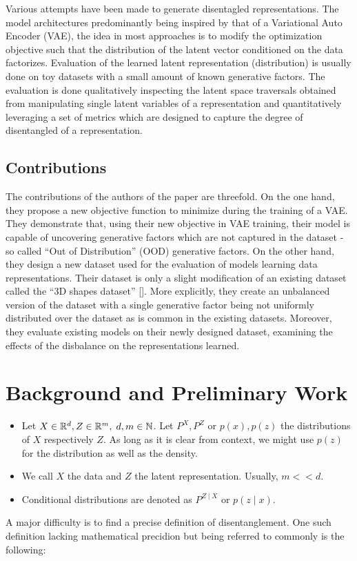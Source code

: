 \documentclass[twoside,11pt]{article}
\newcommand{\N}{\mathbb{N}}
\newcommand{\R}{\mathbb{R}}
\begin{document}
Various attempts have been made to generate disentagled representations. The model architectures predominantly being inspired by that of a Variational Auto Encoder (VAE), the idea in most approaches is to modify the optimization objective such that the distribution of the latent vector conditioned on the data factorizes.
Evaluation of the learned latent representation (distribution) is usually done on toy datasets with a small amount of known generative factors. The evaluation is done qualitatively inspecting the latent space traversals obtained from manipulating single latent variables of a representation and quantitatively leveraging a set of metrics which are designed to capture the degree of disentangled of a representation.

\subsection{Contributions}
The contributions of the authors of the paper are threefold. On the one hand, they propose a new objective function to minimize during the training of a VAE.
They demonstrate that, using their new objective in VAE training, their model is capable of uncovering generative factors which are not captured in the dataset - so called \enquote{Out of Distribution} (OOD) generative factors.
On the other hand, they design a new dataset used for the evaluation of models learning data representations. Their dataset is only a slight modification of an existing dataset called the \enquote{3D shapes dataset} [\cite{3dshapes18}]. More explicitly, they create an unbalanced version of the dataset with a single generative factor being not uniformly distributed over the dataset as is common in the existing datasets.
Moreover, they evaluate existing models on their newly designed dataset, examining the effects of the disbalance on the representations learned.

\section{Background and Preliminary Work}
\begin{itemize}
  \item Let $X \in \R^{d}, Z \in \R^{m}, \hspace{0.1 cm} d,m \in \N$. Let $P^{X}, P^{Z}$ or $p(x), p(z)$ the distributions of $X$ respectively $Z$. As long as it is clear from context, we might use $p(z)$ for the distribution as well as the density.
  \item We call $X$ the data and $Z$ the latent representation. Usually, $m << d$.
  \item Conditional distributions are denoted as $P^{Z \mid X}$ or $p(z \mid x)$.
\end{itemize}
A major difficulty is to find a precise definition of disentanglement. One such definition lacking mathematical precidion but being referred to commonly is the following:
\end{document}
